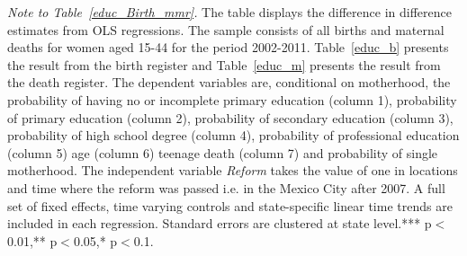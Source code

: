 \documentclass[a4paper, 11pt]{article}
\begin{document}
\begin{spacing}{1.4}
\begin{table}[H]
\begin{threeparttable}
 		\begin{tablenotes} 
 			\footnotesize	\item \textit{Note to Table~\ref{educ_Birth_mmr}.} The table displays the difference in difference estimates from OLS regressions. The sample consists of all births and maternal deaths for women aged 15-44 for the period 2002-2011. Table~\ref{educ_b} presents the result from the birth register and Table~\ref{educ_m} presents the result from the death register. The dependent variables are, conditional on motherhood, the probability of having no or incomplete primary education (column 1), probability of primary education (column 2), probability of secondary education (column 3), probability of high school degree (column 4), probability of professional education (column 5) age (column 6) teenage death (column 7) and probability of single motherhood. The independent variable \textit{Reform} takes the value of one in locations and time where the reform was passed i.e. in the Mexico City after 2007. A full set of fixed effects, time varying controls and state-specific linear time trends are included in each regression. Standard errors are clustered at state level.*** p$<$0.01,** p$<$0.05,* p$<$0.1.  
 		\end{tablenotes}
 		
 	\end{threeparttable}
 \end{table}


\end{spacing}
\end{document}
